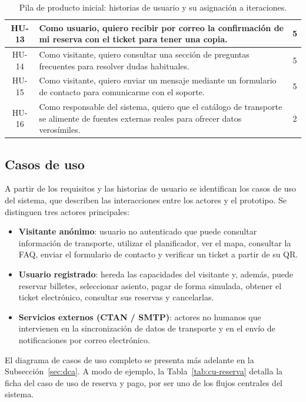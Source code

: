 \begin{table}[h!]
\begin{tabular}{|c|p{10cm}|c|}
HU-13 & Como usuario, quiero recibir por correo la confirmación de mi reserva con el ticket para tener una copia. & 5 \\ \hline
HU-14 & Como visitante, quiero consultar una sección de preguntas frecuentes para resolver dudas habituales. & 5 \\ \hline
HU-15 & Como visitante, quiero enviar un mensaje mediante un formulario de contacto para comunicarme con el soporte. & 5 \\ \hline
HU-16 & Como responsable del sistema, quiero que el catálogo de transporte se alimente de fuentes externas reales para ofrecer datos verosímiles. & 2 \\ \hline
\end{tabular}
\caption{Pila de producto inicial: historias de usuario y su asignación a iteraciones.}
\label{tab:historias-usuario}
\end{table}


\subsection{Casos de uso}
\label{sec:casos-uso-spec}

A partir de los requisitos y las historias de usuario se identifican los casos de uso del sistema, que describen las interacciones entre los actores y el prototipo. Se distinguen tres actores principales:

\begin{itemize}
  \item \textbf{Visitante anónimo}: usuario no autenticado que puede consultar información de transporte, utilizar el planificador, ver el mapa, consultar la FAQ, enviar el formulario de contacto y verificar un ticket a partir de su QR.
  \item \textbf{Usuario registrado}: hereda las capacidades del visitante y, además, puede reservar billetes, seleccionar asiento, pagar de forma simulada, obtener el ticket electrónico, consultar sus reservas y cancelarlas.
  \item \textbf{Servicios externos (CTAN / SMTP)}: actores no humanos que intervienen en la sincronización de datos de transporte y en el envío de notificaciones por correo electrónico.
\end{itemize}

El diagrama de casos de uso completo se presenta más adelante en la Subsección~\ref{sec:dca}. A modo de ejemplo, la Tabla~\ref{tab:cu-reserva} detalla la ficha del caso de uso de reserva y pago, por ser uno de los flujos centrales del sistema.

